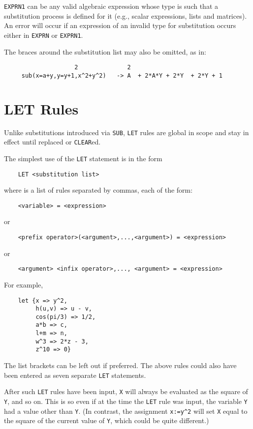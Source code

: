 {\tt EXPRN1} can be any valid algebraic expression whose type is such that
a substitution process is defined for it (e.g., scalar expressions, lists
and matrices).  An error will occur if an expression of an invalid type
for substitution occurs either in {\tt EXPRN} or {\tt EXPRN1}.

The braces around the substitution list may also be omitted, as in:

\begin{verbatim}
				    2              2
     sub(x=a+y,y=y+1,x^2+y^2)   -> A  + 2*A*Y + 2*Y  + 2*Y + 1
\end{verbatim}

\section{LET Rules}
Unlike substitutions introduced via {\tt SUB}, {\tt LET}
rules are global in scope and stay in effect until replaced or {\tt CLEAR}ed.

The simplest use of the {\tt LET} statement is in the form
\begin{verbatim}
	LET <substitution list>
\end{verbatim}
where {\tt <substitution list>} is a list of rules separated by commas, each
of the form:
\begin{verbatim}
	<variable> = <expression>
\end{verbatim}
or
\begin{verbatim}
    <prefix operator>(<argument>,...,<argument>) = <expression>
\end{verbatim}
or
\begin{verbatim}
    <argument> <infix operator>,..., <argument> = <expression>
\end{verbatim}
For example,
\begin{verbatim}
	let {x => y^2,
	     h(u,v) => u - v,
	     cos(pi/3) => 1/2,
	     a*b => c,
	     l+m => n,
	     w^3 => 2*z - 3,
	     z^10 => 0}
\end{verbatim}
The list brackets can be left out if preferred.  The above rules could
also have been entered as seven separate {\tt LET} statements.

After such {\tt LET} rules have been input, {\tt X} will always be
evaluated as the square of {\tt Y}, and so on.  This is so even if at the
time the {\tt LET} rule was input, the variable {\tt Y} had a value other
than {\tt Y}. (In contrast, the assignment {\tt x:=y\verb|^|2} will set {\tt X}
equal to the square of the current value of {\tt Y}, which could be quite
different.)

